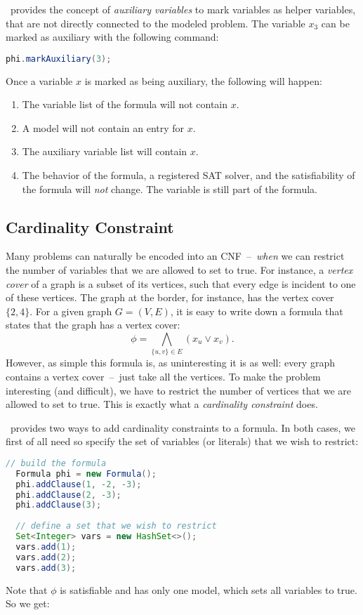 \documentclass[a4paper, ukenglish, twoside, openright]{jdrasilmanual}
\begin{document}
\Jdrasil\ provides the concept of \emph{auxiliary variables} to mark
variables as helper variables, that are not directly connected to the
modeled problem. The variable $x_3$ can be marked as auxiliary with the
following command:
\begin{lstlisting}[language=Java]
  phi.markAuxiliary(3);
\end{lstlisting}
Once a variable $x$ is marked as being auxiliary, the following will
happen:
\begin{enumerate}
  \item The variable list of the formula will not contain $x$.
  \item A model will not contain an entry for $x$.
  \item The auxiliary variable list will contain $x$.
  \item The behavior of the formula, a registered SAT solver, and the
    satisfiability of the formula will \emph{not} change. The variable
    is still part of the formula.
\end{enumerate}

\subsection{Cardinality Constraint}
Many problems can naturally be encoded into an CNF~–~\emph{when} we can
restrict the number of variables that we are allowed to set to
true. For instance, a \emph{vertex cover} of a graph is a subset of
its vertices, such that every edge is incident to one of these
vertices. The graph at the border, for instance, has the vertex cover $\{2,4\}$.
For a given graph $G=(V,E)$, it is easy to write down a formula that
states that the graph has a vertex cover:
\[
   \phi=\bigwedge_{\{u,v\}\in E}(x_u\vee x_v).
\]
However, as simple this formula is, as uninteresting it is as well:
every graph contains a vertex cover~–~just take all the vertices. To make
the problem interesting (and difficult), we have to restrict the
number of vertices that we are allowed to set to true. This is exactly
what a \emph{cardinality constraint} does.

\Jdrasil\ provides two ways to add cardinality constraints to a
formula. In both cases, we first of all need so specify the set of
variables (or literals) that we wish to restrict:
\begin{lstlisting}[language=Java]
  // build the formula
  Formula phi = new Formula();
  phi.addClause(1, -2, -3);
  phi.addClause(2, -3);
  phi.addClause(3);
  
  // define a set that we wish to restrict
  Set<Integer> vars = new HashSet<>();
  vars.add(1);
  vars.add(2);
  vars.add(3);
\end{lstlisting}
Note that $\phi$ is satisfiable and has only one model, which sets all
variables to true. So we get:
\end{document}

